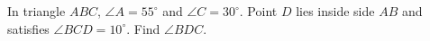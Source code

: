 In triangle $ABC$, $\angle A=55^\circ$ and $\angle C=30^\circ$. Point $D$ lies inside side $AB$ and satisfies $\angle BCD=10^\circ$. Find $\angle BDC$.
